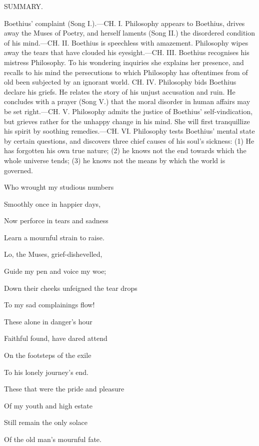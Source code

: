 
SUMMARY.

Boethius' complaint (Song I.).—CH. I. Philosophy appears to
Boethius, drives away the Muses of Poetry, and herself laments
(Song II.) the disordered condition of his mind.—CH. II. Boethius
is speechless with amazement. Philosophy wipes away the tears that
have clouded his eyesight.—CH. III. Boethius recognises his
mistress Philosophy. To his wondering inquiries she explains her
presence, and recalls to his mind the persecutions to which
Philosophy has oftentimes from of old been subjected by an ignorant
world. CH. IV. Philosophy bids Boethius declare his griefs. He
relates the story of his unjust accusation and ruin. He concludes
with a prayer (Song V.) that the moral disorder in human affairs
may be set right.—CH. V. Philosophy admits the justice of
Boethius' self-vindication, but grieves rather for the unhappy
change in his mind. She will first tranquillize his spirit by
soothing remedies.—CH. VI. Philosophy tests Boethius' mental
state by certain questions, and discovers three chief causes of his
soul's sickness: (1) He has forgotten his own true nature; (2) he
knows not the end towards which the whole universe tends; (3) he
knows not the means by which the world is governed.


Who wrought my studious numbers

Smoothly once in happier days,

Now perforce in tears and sadness

Learn a mournful strain to raise.

Lo, the Muses, grief-dishevelled,

Guide my pen and voice my woe;

Down their cheeks unfeigned the tear drops

To my sad complainings flow!

These alone in danger's hour

Faithful found, have dared attend

On the footsteps of the exile

To his lonely journey's end.

These that were the pride and pleasure

Of my youth and high estate

Still remain the only solace

Of the old man's mournful fate.

